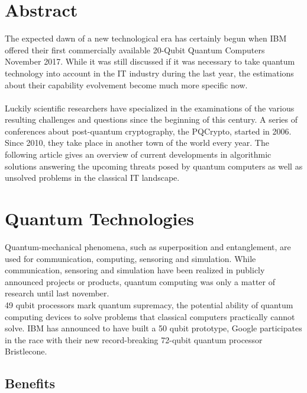 \documentclass[a4paper,11pt]{article}
\begin{document}
\begin{multicols}{2}
 
\section{Abstract}

The expected dawn of a new technological era has certainly begun when IBM offered their first commercially available 20-Qubit Quantum Computers November 2017.
While it was still discussed if it was necessary to take quantum technology into account in the IT industry during the last year, the estimations about their capability evolvement become much more specific now.\\ \\
Luckily scientific researchers have specialized in the examinations of the various resulting challenges and questions since the beginning of this century. A series of conferences about post-quantum cryptography, the PQCrypto, started in 2006. Since 2010, they take place in another town of the world every year. The following article gives an overview of current developments in algorithmic solutions answering the upcoming threats posed by quantum computers as well as unsolved problems in the classical IT landscape. 
  

\section{Quantum Technologies}

Quantum-mechanical phenomena, such as superposition and entanglement, are used for communication, computing, sensoring and simulation. While communication, sensoring and simulation have been realized in publicly announced projects or products, quantum computing was only a matter of research until last november. \\
49 qubit processors mark quantum supremacy, the potential ability of quantum computing devices to solve problems that classical computers practically cannot solve. IBM has announced to have built a 50 qubit prototype, Google participates in the race with their new record-breaking 72-qubit quantum processor Bristlecone.

\subsection{Benefits}


\end{multicols}
\end{document}
